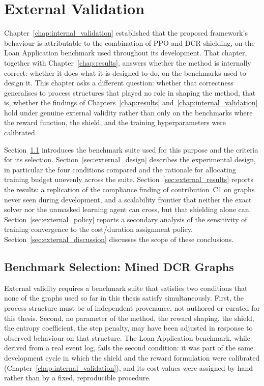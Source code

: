 
\chapter{External Validation}
\label{chap:external_validation}

Chapter~\ref{chap:internal_validation} established that the proposed
framework's behaviour is attributable to the combination of \ac{PPO}
and \ac{DCR} shielding, on the Loan Application benchmark used
throughout its development. That chapter, together with
Chapter~\ref{chap:results}, answers whether the method is internally
correct: whether it does what it is designed to do, on the benchmarks
used to design it. This chapter asks a different question: whether
that correctness generalises to process structures that played no role
in shaping the method, that is, whether the findings of
Chapters~\ref{chap:results} and~\ref{chap:internal_validation} hold
under genuine external validity rather than only on the benchmarks
where the reward function, the shield, and the training
hyperparameters were calibrated.

Section~\ref{sec:external_benchmark_grid} introduces the benchmark
suite used for this purpose and the criteria for its selection.
Section~\ref{sec:external_design} describes the experimental design,
in particular the four conditions compared and the rationale for
allocating training budget unevenly across the suite.
Section~\ref{sec:external_results} reports the results: a replication
of the compliance finding of contribution~C1 on graphs never seen
during development, and a scalability frontier that neither the exact
solver nor the unmasked learning agent can cross, but that shielding
alone can. Section~\ref{sec:external_policy} reports a secondary
analysis of the sensitivity of training convergence to the
cost/duration assignment policy. Section~\ref{sec:external_discussion}
discusses the scope of these conclusions.

\section{Benchmark Selection: Mined DCR Graphs}
\label{sec:external_benchmark_grid}

External validity requires a benchmark suite that satisfies two
conditions that none of the graphs used so far in this thesis satisfy
simultaneously. First, the process structure must be of independent
provenance, not authored or curated for this thesis. Second, no
parameter of the method, the reward shaping, the shield, the
entropy coefficient, the step penalty, may have been adjusted in
response to observed behaviour on that structure. The Loan Application
benchmark, while derived from a real event log, fails the second
condition: it was part of the same development cycle in which the
shield and the reward formulation were calibrated
(Chapter~\ref{chap:internal_validation}), and its cost values were
assigned by hand rather than by a fixed, reproducible procedure.

